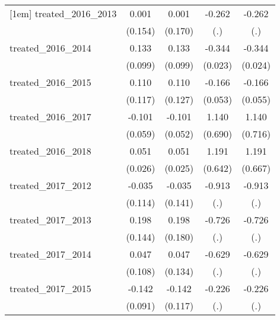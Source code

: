 {\begin{tabular}{l*{4}{c}}
[1em]
treated\_2016\_2013&       0.001         &       0.001         &      -0.262         &      -0.262         \\
            &     (0.154)         &     (0.170)         &         (.)         &         (.)         \\
[1em]
treated\_2016\_2014&       0.133         &       0.133         &      -0.344\sym{***}&      -0.344\sym{***}\\
            &     (0.099)         &     (0.099)         &     (0.023)         &     (0.024)         \\
[1em]
treated\_2016\_2015&       0.110         &       0.110         &      -0.166\sym{**} &      -0.166\sym{**} \\
            &     (0.117)         &     (0.127)         &     (0.053)         &     (0.055)         \\
[1em]
treated\_2016\_2017&      -0.101         &      -0.101         &       1.140         &       1.140         \\
            &     (0.059)         &     (0.052)         &     (0.690)         &     (0.716)         \\
[1em]
treated\_2016\_2018&       0.051         &       0.051\sym{*}  &       1.191         &       1.191         \\
            &     (0.026)         &     (0.025)         &     (0.642)         &     (0.667)         \\
[1em]
treated\_2017\_2012&      -0.035         &      -0.035         &      -0.913         &      -0.913         \\
            &     (0.114)         &     (0.141)         &         (.)         &         (.)         \\
[1em]
treated\_2017\_2013&       0.198         &       0.198         &      -0.726         &      -0.726         \\
            &     (0.144)         &     (0.180)         &         (.)         &         (.)         \\
[1em]
treated\_2017\_2014&       0.047         &       0.047         &      -0.629         &      -0.629         \\
            &     (0.108)         &     (0.134)         &         (.)         &         (.)         \\
[1em]
treated\_2017\_2015&      -0.142         &      -0.142         &      -0.226         &      -0.226         \\
            &     (0.091)         &     (0.117)         &         (.)         &         (.)         \\

\end{tabular}}
